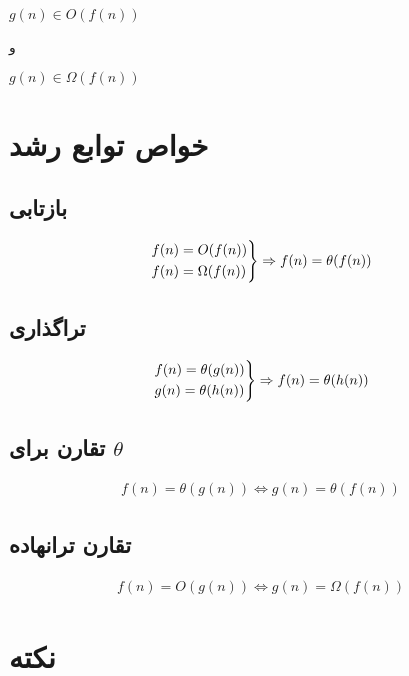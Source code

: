 \documentclass[12pt]{book}
\begin{document}
\begin{center}
$g(n) \in O(f(n))$

و

$g(n) \in \Omega(f(n))$
\end{center}


\section{خواص توابع رشد}


\subsection{بازتابی}

\begin{align*}
\begin{rcases}
f(n) = O(f(n)) \\
f(n) = \Omega(f(n))
\end{rcases} \Rightarrow
f(n) = \theta(f(n))
\end{align*}

\subsection{تراگذاری}

\begin{align*}
\begin{rcases}
f(n) = \theta(g(n)) \\
g(n) = \theta(h(n))
\end{rcases} \Rightarrow
f(n) = \theta(h(n))
\end{align*}

\subsection{تقارن برای $\theta$}

\begin{align*}
f(n) = \theta(g(n)) \Leftrightarrow  g(n) = \theta(f(n))
\end{align*}

\subsection{تقارن ترانهاده}

\begin{align*}
f(n) = O(g(n)) \Leftrightarrow g(n) = \Omega(f(n))
\end{align*}

\section{نکته}
\end{document}
